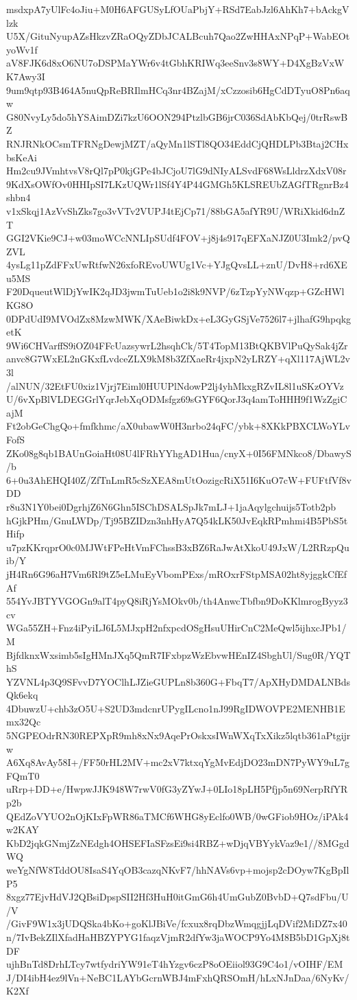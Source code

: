 msdxpA7yUlFc4oJiu+M0H6AFGUSyLfOUaPbjY+RSd7EabJzl6AhKh7+bAckgVlzk
U5X/GituNyupAZsHkzvZRaOQyZDbJCALBcuh7Qao2ZwHHAxNPqP+WabEOtyoWv1f
aV8FJK6d8xO6NU7oDSPMaYWr6v4tGbhKRIWq3eeSnv3s8WY+D4XgBzVxWK7Awy3I
9um9qtp93B464A5nuQpReBRIlmHCq3nr4BZajM/xCzzosib6HgCdDTyuO8Pn6aqw
G80NvyLy5do5hYSAimDZi7kzU6OON294PtzlbGB6jrC036SdAbKbQej/0trRswBZ
RNJRNkOCsmTFRNgDewjMZT/aQyMn1lSTl8QO34EddCjQHDLPb3Btaj2CHxbsKeAi
Hm2cu9JVmhtvsV8rQl7pP0kjGPe4bJCjoU7lG9dNIyALSvdF68WsLldrzXdxV08r
9KdXsOWfOv0HHIpSI7LKzUQWr1lSf4Y4P44GMGh5KLSREUbZAGfTRgnrBz4shbn4
v1xSkqj1AzVvShZks7go3vVTv2VUPJ4tEjCp71/88bGA5afYR9U/WRiXkid6dnZT
GGI2VKie9CJ+w03moWCcNNLIpSUdf4FOV+j8j4s917qEFXaNJZ0U3Imk2/pvQZVL
4ysLg11pZdFFxUwRtfwN26xfoREvoUWUg1Vc+YJgQvsLL+znU/DvH8+rd6XEu5MS
F20DqueutWlDjYwIK2qJD3jwmTuUeb1o2i8k9NVP/6zTzpYyNWqzp+GZcHWlKG8O
0DPdUdI9MVOdZx8MzwMWK/XAeBiwkDx+eL3GyGSjVe7526l7+jlhafG9hpqkgetK
9Wi6CHVarffS9iOZ04FFcUazsywrL2hsqhCk/5T4TopM13BtQKBVlPuQySak4jZr
anvc8G7WxEL2nGKxfLvdceZLX9kM8b3ZfXaeRr4jxpN2yLRZY+qXl117AjWL2v3l
/alNUN/32EtFU0xiz1Vjrj7Eiml0HUUPlNdowP2lj4yhMkxgRZvIL8l1uSKzOYVz
U/6vXpBlVLDEGGrlYqrJebXqODMsfgz69sGYF6QorJ3q4amToHHH9f1WzZgiCajM
Ft2obGeChgQo+fmfkhmc/aX0ubawW0H3nrbo24qFC/ybk+8XKkPBXCLWoYLvFofS
ZKo08g8qb1BAUnGoiaHt08U4lFRhYYhgAD1Hua/cnyX+0I56FMNkco8/DbawyS/b
6+0u3AhEHQI40Z/ZfTnLmR5cSzXEA8mUtOozigcRiX51I6KuO7cW+FUFtfVf8vDD
r8u3N1Y0bei0DgrhjZ6N6Ghn5ISChDSALSpJk7mLJ+1jaAqylgchuijs5Totb2pb
hGjkPHm/GnuLWDp/Tj95BZIDzn3nhHyA7Q54kLK50JvEqkRPmhmi4B5PbS5tHifp
u7pzKKrqprO0c0MJWtFPeHtVmFChssB3xBZ6RaJwAtXkoU49JxW/L2RRzpQuib/Y
jH4Rn6G96aH7Vm6Rl9tZ5eLMuEyVbomPExs/mROxrFStpMSA02ht8yjggkCfEfAf
554YvJBTYVGOGn9alT4pyQ8iRjYsMOkv0b/th4AnwcTbfbn9DoKKlmrogByyz3cv
WGa55ZH+Fnz4iPyiLJ6L5MJxpH2nfxpcdOSgHsuUHirCnC2MeQwl5ijhxcJPb1/M
BjfdknxWxsimb5sIgHMnJXq5QmR7IFxbpzWzEbvwHEnIZ4SbghUl/Sug0R/YQThS
YZVNL4p3Q9SFvvD7YOClhLJZieGUPLn8b360G+FbqT7/ApXHyDMDALNBdsQk6ekq
4DbuwzU+chb3zO5U+S2UD3mdcnrUPygILcno1nJ99RgIDWOVPE2MENHB1Emx32Qc
5NGPEOdrRN30REPXpR9mh8xNx9AqePrOskxsIWnWXqTxXikz5lqtb361aPtgijrw
A6Xq8AvAy58I+/FF50rHL2MV+mc2xV7ktxqYgMvEdjDO23mDN7PyWY9uL7gFQmT0
uRrp+DD+e/HwpwJJK948W7rwV0fG3yZYwJ+0LIo18pLH5Pfjp5n69NerpRfYRp2b
QEdZoVYUO2nOjKIxFpWR86aTMCf6WHG8yEclfo0WB/0wGFiob9HOz/iPAk4w2KAY
KbD2jqkGNmjZzNEdgh4OHSEFIaSFzsEi9si4RBZ+wDjqVBYykVaz9e1//8MGgdWQ
weYgNfW8TddOU8IsaS4YqOB3cazqNKvF7/hhNAVs6vp+mojsp2cDOyw7KgBpIlP5
8xgz77EjvHdVJ2QBsiDpspSII2Hf3HuH0itGmG6h4UmGubZ0BvbD+Q7sdFbu/U/V
/GivF9W1x3jUDQSka4bKo+goKlJBiVe/fcxux8rqDbzWmqgjjLqDVif2MiDZ7x40
n/7IvBekZIlXfadHaHBZYPYG1faqzVjmR2dfYw3jaWOCP9Yo4M8B5bD1GpXj8tDF
ujhBnTd8DrhLTcy7wtfydriYW91eT4hYzgv6czP8oOEiiol93G9C4o1/vOIHF/EM
J/DI4ibH4ez9lVn+NeBC1LAYbGcrnWBJ4mFxhQRSOmH/hLxNJnDaa/6NyKv/K2Xf
